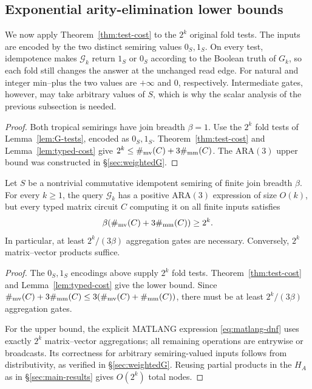 \subsection{Exponential arity-elimination lower bounds}\label{sec:arity-bounds}
We now apply Theorem~\ref{thm:test-cost} to the $2^k$ original fold
tests. The inputs are encoded by the two distinct semiring values
$0_S,1_S$. On every test, idempotence makes $\mathcal G_k$
return $1_S$ or $0_S$ according to the Boolean truth of $G_k$,
so each fold still changes the answer at the unchanged read edge.
For natural and integer min--plus the two values are $+\infty$
and $0$, respectively. Intermediate gates, however, may take
arbitrary values of $S$, which is why the scalar analysis of the
previous subsection is needed.

\tropicalmatrixbounds*
\begin{proof}
Both tropical semirings have join breadth $\beta=1$.
Use the $2^k$ fold tests of Lemma~\ref{lem:G-tests},
encoded as $0_S,1_S$. Theorem~\ref{thm:test-cost} and
Lemma~\ref{lem:typed-cost} give
$2^k\le\#_{\mathrm{mv}}(C)+3\#_{\mathrm{mm}}(C)$.
The ARA$(3)$ upper bound was constructed in \S\ref{sec:weightedG}.
\end{proof}

\begin{theorem}\label{cor:matrix}
Let $S$ be a nontrivial commutative idempotent semiring of finite
join breadth $\beta$. For every $k\ge1$, the query $\mathcal G_k$
has a positive ARA$(3)$ expression of size $O(k)$, but every typed
matrix circuit $C$ computing it on all finite inputs satisfies
\[
 \beta(\#_{\mathrm{mv}}(C)+3\#_{\mathrm{mm}}(C))\ge2^k.
\]
In particular, at least $2^k/(3\beta)$ aggregation gates are
necessary. Conversely, $2^k$ matrix--vector products suffice.
\end{theorem}
\begin{proof}
The $0_S,1_S$ encodings above supply $2^k$ fold tests.
Theorem~\ref{thm:test-cost} and Lemma~\ref{lem:typed-cost} give
the lower bound. Since
$\#_{\mathrm{mv}}(C)+3\#_{\mathrm{mm}}(C)\le3(\#_{\mathrm{mv}}(C)+\#_{\mathrm{mm}}(C))$,
there must be at least $2^k/(3\beta)$ aggregation gates.

For the upper bound, the explicit MATLANG expression
\eqref{eq:matlang-dnf} uses exactly $2^k$ matrix--vector
aggregations; all remaining operations are entrywise or broadcasts.
Its correctness for arbitrary semiring-valued inputs follows from
distributivity, as verified in \S\ref{sec:weightedG}.
Reusing partial products in the $H_A$ as in
\S\ref{sec:main-results} gives $O(2^k)$ total nodes.
\end{proof}


